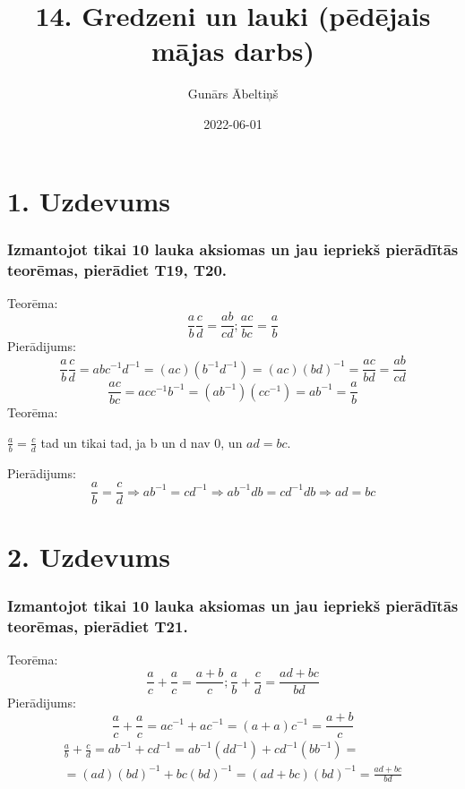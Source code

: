 \documentclass{article}
\title{14. Gredzeni un lauki (pēdējais mājas darbs)}
\author{Gunārs Ābeltiņš}
\date{2022-06-01}
\begin{document}
\maketitle

\section*{1. Uzdevums}
\subsubsection*{Izmantojot tikai 10 lauka aksiomas un jau iepriekš pierādītās \\ teorēmas, pierādiet T19, T20.}

Teorēma:
\begin{equation*}
    \frac{a}{b}\frac{c}{d}=\frac{ab}{cd}; \frac{ac}{bc}=\frac{a}{b}
\end{equation*}
Pierādijums:
\begin{equation*}
    \frac{a}{b}\frac{c}{d}=abc^{-1}d^{-1}=(ac)(b^{-1}d^{-1})=(ac)(bd)^{-1}=\frac{ac}{bd}=\frac{ab}{cd}
\end{equation*}
\begin{equation*}
    \frac{ac}{bc}=acc^{-1}b^{-1}=(ab^{-1})(cc^{-1})=ab^{-1}=\frac{a}{b}
\end{equation*}
Teorēma:
\begin{center}
    $\frac{a}{b}=\frac{c}{d}$ tad un tikai tad, ja b un d nav 0, un $ad=bc$.
\end{center}
Pierādijums:
\begin{equation*}
    \frac{a}{b}=\frac{c}{d} \Rightarrow ab^{-1}=cd^{-1} \Rightarrow ab^{-1}db=cd^{-1}db \Rightarrow ad=bc
\end{equation*}

\section*{2. Uzdevums}
\subsubsection*{Izmantojot tikai 10 lauka aksiomas un jau iepriekš pierādītās \\ teorēmas, pierādiet T21.}

Teorēma:
\begin{equation*}
    \frac{a}{c}+\frac{a}{c}=\frac{a+b}{c};\frac{a}{b}+\frac{c}{d}=\frac{ad+bc}{bd}
\end{equation*}
Pierādijums:
\begin{equation*}
    \frac{a}{c}+\frac{a}{c}=ac^{-1}+ac^{-1}=(a+a)c^{-1}=\frac{a+b}{c}
\end{equation*}
\begin{gather*}
    \frac{a}{b}+\frac{c}{d}=ab^{-1}+cd^{-1}=ab^{-1}(dd^{-1})+cd^{-1}(bb^{-1})=\\
    =(ad)(bd)^{-1}+bc(bd)^{-1}=(ad+bc)(bd)^{-1}=\frac{ad+bc}{bd}
\end{gather*}
\end{document}
